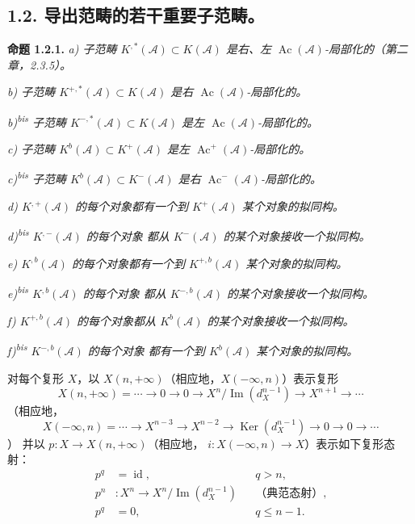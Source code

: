 \clearpage
{}%
\begingroup\small\setlength{\parskip}{0pt}\setlength{\emergencystretch}{1.5em}
\setlength{\abovedisplayskip}{4pt plus 2pt minus 2pt}%
\setlength{\belowdisplayskip}{4pt plus 2pt minus 2pt}%

\subsection*{1.2. 导出范畴的若干重要子范畴。}

\noindent\textbf{命题 1.2.1.}\quad
\textit{a) 子范畴 $K^{,*}(\mathcal A)\subset K(\mathcal A)$ 是右、左
$\operatorname{Ac}(\mathcal A)$-局部化的（第二章，2.3.5）。}

\noindent\textit{b) 子范畴 $K^{+,*}(\mathcal A)\subset K(\mathcal A)$
是右 $\operatorname{Ac}(\mathcal A)$-局部化的。}

\noindent\textit{b)\textsuperscript{bis} 子范畴
$K^{-,*}(\mathcal A)\subset K(\mathcal A)$ 是左
$\operatorname{Ac}(\mathcal A)$-局部化的。}

\noindent\textit{c) 子范畴 $K^{b}(\mathcal A)\subset K^{+}(\mathcal A)$
是左 $\operatorname{Ac}^{+}(\mathcal A)$-局部化的。}

\noindent\textit{c)\textsuperscript{bis} 子范畴
$K^{b}(\mathcal A)\subset K^{-}(\mathcal A)$ 是右
$\operatorname{Ac}^{-}(\mathcal A)$-局部化的。}

\noindent\textit{d) $K^{,+}(\mathcal A)$ 的每个对象都有一个到
$K^{+}(\mathcal A)$ 某个对象的拟同构。}

\noindent\textit{d)\textsuperscript{bis} $K^{,-}(\mathcal A)$ 的每个对象
都从 $K^{-}(\mathcal A)$ 的某个对象接收一个拟同构。}

\noindent\textit{e) $K^{,b}(\mathcal A)$ 的每个对象都有一个到
$K^{+,b}(\mathcal A)$ 某个对象的拟同构。}

\noindent\textit{e)\textsuperscript{bis} $K^{,b}(\mathcal A)$ 的每个对象
都从 $K^{-,b}(\mathcal A)$ 的某个对象接收一个拟同构。}

\noindent\textit{f) $K^{+,b}(\mathcal A)$ 的每个对象都从
$K^{b}(\mathcal A)$ 的某个对象接收一个拟同构。}

\noindent\textit{f)\textsuperscript{bis} $K^{-,b}(\mathcal A)$ 的每个对象
都有一个到 $K^{b}(\mathcal A)$ 某个对象的拟同构。}

对每个复形 $X$，以 $X(n,+\infty)$（相应地，$X(-\infty,n)$）表示复形
\[
X(n,+\infty)=\cdots\longrightarrow0\longrightarrow0
\longrightarrow X^n/\operatorname{Im}(d_X^{n-1})
\longrightarrow X^{n+1}\longrightarrow\cdots
\]
（相应地，
\[
X(-\infty,n)=\cdots\longrightarrow X^{n-3}\longrightarrow X^{n-2}
\longrightarrow\operatorname{Ker}(d_X^{n-1})
\longrightarrow0\longrightarrow0\longrightarrow\cdots
\]）
并以 $p\colon X\longrightarrow X(n,+\infty)$（相应地，
$i\colon X(-\infty,n)\longrightarrow X$）表示如下复形态射：
\[
\begin{aligned}
p^q&=\operatorname{id},&&q>n,\\
p^n&\colon X^n\longrightarrow X^n/\operatorname{Im}(d_X^{n-1})
  &&\text{（典范态射）},\\
p^q&=0,&&q\leq n-1.
\end{aligned}
\]
\endgroup
